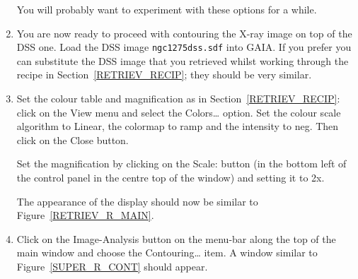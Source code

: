 \documentclass[twoside,11pt]{starlink}
\begin{document}
\begin{enumerate}
   You will probably want to experiment with these options for a while.

  \item You are now ready to proceed with contouring the X-ray image on top
   of the DSS one.  Load the DSS image \texttt{ngc1275dss.sdf} into GAIA.  If
   you prefer you can substitute the DSS image that you retrieved whilst
   working through the recipe in Section~\ref{RETRIEV_RECIP}; they should
   be very similar.

  \item Set the colour table and magnification as in
   Section~\ref{RETRIEV_RECIP}: click on the \textsf{View} menu and select
   the \textsf{Colors\ldots} option.  Set the colour scale algorithm to \textsf{Linear}, the colormap to \textsf{ramp} and the intensity to \textsf{neg}.
   Then click on the \textsf{Close} button.

   Set the magnification by clicking on the \textsf{Scale:} button (in the
   bottom left of the control panel in the centre top of the window) and
   setting it to \textsf{2x}.

   The appearance of the display should now be similar to
   Figure~\ref{RETRIEV_R_MAIN}.

  \item Click on the \textsf{Image-Analysis} button on the menu-bar along the
   top of the main window and choose the \textsf{Contouring\ldots} item.
   A window similar to Figure~\ref{SUPER_R_CONT} should appear.


\end{enumerate}
\end{document}
